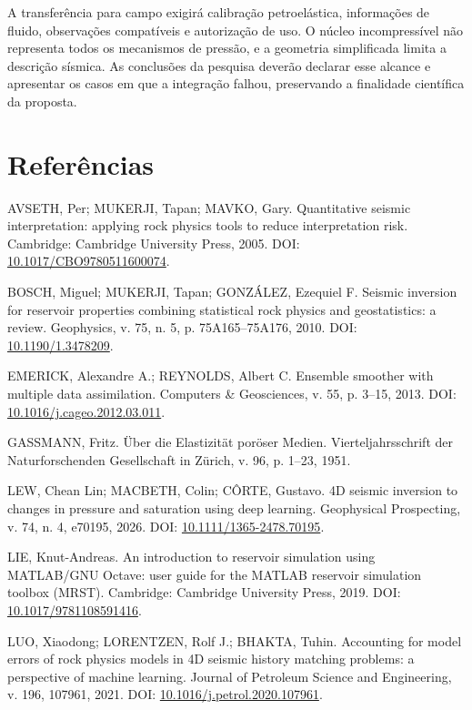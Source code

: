 \documentclass[12pt,a4paper]{article}
\begin{document}
A transferência para campo exigirá calibração petroelástica, informações de fluido, observações compatíveis e autorização de uso. O núcleo incompressível não representa todos os mecanismos de pressão, e a geometria simplificada limita a descrição sísmica. As conclusões da pesquisa deverão declarar esse alcance e apresentar os casos em que a integração falhou, preservando a finalidade científica da proposta.\par

\newpage
\section*{Referências}
\noindent AVSETH, Per; MUKERJI, Tapan; MAVKO, Gary. Quantitative seismic interpretation: applying rock physics tools to reduce interpretation risk. Cambridge: Cambridge University Press, 2005. DOI: \href{https://doi.org/10.1017/CBO9780511600074}{10.1017/CBO9780511600074}.\par
\noindent BOSCH, Miguel; MUKERJI, Tapan; GONZÁLEZ, Ezequiel F. Seismic inversion for reservoir properties combining statistical rock physics and geostatistics: a review. Geophysics, v. 75, n. 5, p. 75A165--75A176, 2010. DOI: \href{https://doi.org/10.1190/1.3478209}{10.1190/1.3478209}.\par
\noindent EMERICK, Alexandre A.; REYNOLDS, Albert C. Ensemble smoother with multiple data assimilation. Computers \& Geosciences, v. 55, p. 3--15, 2013. DOI: \href{https://doi.org/10.1016/j.cageo.2012.03.011}{10.1016/j.cageo.2012.03.011}.\par
\noindent GASSMANN, Fritz. Über die Elastizität poröser Medien. Vierteljahrsschrift der Naturforschenden Gesellschaft in Zürich, v. 96, p. 1--23, 1951.\par
\noindent LEW, Chean Lin; MACBETH, Colin; CÔRTE, Gustavo. 4D seismic inversion to changes in pressure and saturation using deep learning. Geophysical Prospecting, v. 74, n. 4, e70195, 2026. DOI: \href{https://doi.org/10.1111/1365-2478.70195}{10.1111/1365-2478.70195}.\par
\noindent LIE, Knut-Andreas. An introduction to reservoir simulation using MATLAB/GNU Octave: user guide for the MATLAB reservoir simulation toolbox (MRST). Cambridge: Cambridge University Press, 2019. DOI: \href{https://doi.org/10.1017/9781108591416}{10.1017/9781108591416}.\par
\noindent LUO, Xiaodong; LORENTZEN, Rolf J.; BHAKTA, Tuhin. Accounting for model errors of rock physics models in 4D seismic history matching problems: a perspective of machine learning. Journal of Petroleum Science and Engineering, v. 196, 107961, 2021. DOI: \href{https://doi.org/10.1016/j.petrol.2020.107961}{10.1016/j.petrol.2020.107961}.\par
\end{document}
